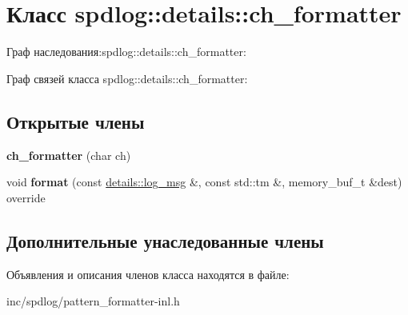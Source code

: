 \hypertarget{classspdlog_1_1details_1_1ch__formatter}{}\section{Класс spdlog\+:\+:details\+:\+:ch\+\_\+formatter}
\label{classspdlog_1_1details_1_1ch__formatter}


Граф наследования\+:spdlog\+:\+:details\+:\+:ch\+\_\+formatter\+:


Граф связей класса spdlog\+:\+:details\+:\+:ch\+\_\+formatter\+:
\subsection*{Открытые члены}
\begin{DoxyCompactItemize}
\item 
\mbox{\label{classspdlog_1_1details_1_1ch__formatter_a0ea7f88fed22209cce188238bf103a35}} 
{\bfseries ch\+\_\+formatter} (char ch)
\item 
\mbox{\label{classspdlog_1_1details_1_1ch__formatter_a199e86a077b01332f764ef91dce61059}} 
void {\bfseries format} (const \hyperlink{structspdlog_1_1details_1_1log__msg}{details\+::log\+\_\+msg} \&, const std\+::tm \&, memory\+\_\+buf\+\_\+t \&dest) override
\end{DoxyCompactItemize}
\subsection*{Дополнительные унаследованные члены}


Объявления и описания членов класса находятся в файле\+:\begin{DoxyCompactItemize}
\item 
inc/spdlog/pattern\+\_\+formatter-\/inl.\+h\end{DoxyCompactItemize}
